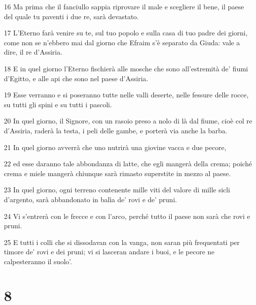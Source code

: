 \par 16 Ma prima che il fanciullo sappia riprovare il male e scegliere il bene, il paese del quale tu paventi i due re, sarà devastato.
\par 17 L'Eterno farà venire su te, sul tuo popolo e sulla casa di tuo padre dei giorni, come non se n'ebbero mai dal giorno che Efraim s'è separato da Giuda: vale a dire, il re d'Assiria.
\par 18 E in quel giorno l'Eterno fischierà alle mosche che sono all'estremità de' fiumi d'Egitto, e alle api che sono nel paese d'Assiria.
\par 19 Esse verranno e si poseranno tutte nelle valli deserte, nelle fessure delle rocce, su tutti gli spini e su tutti i pascoli.
\par 20 In quel giorno, il Signore, con un rasoio preso a nolo di là dal fiume, cioè col re d'Assiria, raderà la testa, i peli delle gambe, e porterà via anche la barba.
\par 21 In quel giorno avverrà che uno nutrirà una giovine vacca e due pecore,
\par 22 ed esse daranno tale abbondanza di latte, che egli mangerà della crema; poiché crema e miele mangerà chiunque sarà rimasto superstite in mezzo al paese.
\par 23 In quel giorno, ogni terreno contenente mille viti del valore di mille sicli d'argento, sarà abbandonato in balìa de' rovi e de' pruni.
\par 24 Vi s'entrerà con le frecce e con l'arco, perché tutto il paese non sarà che rovi e pruni.
\par 25 E tutti i colli che si dissodavan con la vanga, non saran più frequentati per timore de' rovi e dei pruni; vi si lasceran andare i buoi, e le pecore ne calpesteranno il suolo'.

\chapter{8}

